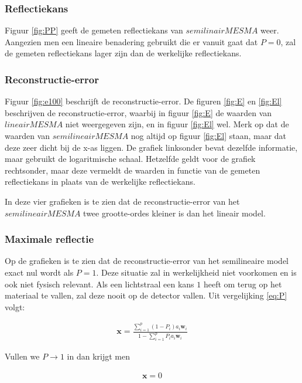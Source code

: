 \documentclass[12pt]{report}
\begin{document}
\subsubsection{Reflectiekans}
Figuur \ref{fig:PP} geeft de gemeten reflectiekans van $semilinair MESMA$ weer. Aangezien men een lineaire benadering gebruikt die er vanuit gaat dat $P=0$, zal de gemeten reflectiekans lager zijn dan de werkelijke reflectiekans.

\subsubsection{Reconstructie-error}

Figuur \ref{fig:e100} beschrijft de reconstructie-error. De figuren \ref{fig:E} en \ref{fig:El} beschrijven de reconstructie-error, waarbij in figuur \ref{fig:E} de waarden van $lineair MESMA$ niet weergegeven zijn, en in figuur \ref{fig:El} wel. Merk op dat de waarden van $semilineair MESMA$ nog altijd op figuur \ref{fig:El} staan, maar dat deze zeer dicht bij de x-as liggen. De grafiek linksonder bevat dezelfde informatie, maar gebruikt de logaritmische schaal. Hetzelfde geldt voor de grafiek rechtsonder, maar deze vermeldt de waarden in functie van de gemeten reflectiekans in plaats van de werkelijke reflectiekans. 

In deze vier grafieken is te zien dat de reconstructie-error van het $semilineair MESMA$ twee grootte-ordes kleiner is dan het lineair model. 


\subsubsection{Maximale reflectie}

Op de grafieken is te zien dat de reconstructie-error van het semilineaire model exact nul wordt als $P=1$. Deze situatie zal in werkelijkheid niet voorkomen en is ook niet fysisch relevant. Als een lichtstraal een kans $1$ heeft om terug op het materiaal te vallen, zal deze nooit op de detector vallen. Uit vergelijking \ref{eq:P} volgt:

\begin{align}
\bm{x} = \frac{\sum_{i=1}^p (1-P_i) a_{i} \bm{w}_{i}}{1-\sum_{i=1}^p P_i a_{i} \bm{w}_{i}}
\end{align}

Vullen we $P \rightarrow 1$ in dan krijgt men

\begin{align}
\bm{x} = 0
\end{align}
\end{document}
